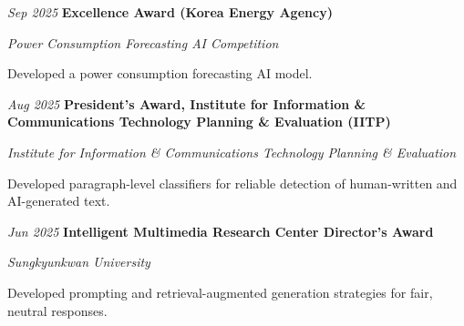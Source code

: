\vspace{0.08cm}

\begin{samepage}
    \begin{twocolentry}{\textit{Sep 2025}}
        \textbf{Excellence Award (Korea Energy Agency)}\href{https://github.com/rkdrn79/2025_Electricity_Consumption_Forecasting_AI_Competition_SKKUAI}{}
        \par\textit{Power Consumption Forecasting AI Competition}
    \end{twocolentry}
    \begin{onecolentry}
        \begin{highlights}
            \item Developed a power consumption forecasting AI model.
        \end{highlights}
    \end{onecolentry}
\end{samepage}

\vspace{0.08cm}

\begin{samepage}
    \begin{twocolentry}{\textit{Aug 2025}}
        \textbf{President's Award, Institute for Information \& Communications Technology Planning \& Evaluation (IITP)}\href{https://github.com/rkdrn79/2025_SW_Centered_University_Digital_Competition_SKKUAI}{}
        \par\textit{Institute for Information \& Communications Technology Planning \& Evaluation}
    \end{twocolentry}
    \begin{onecolentry}
        \begin{highlights}
            \item Developed paragraph-level classifiers for reliable detection of human-written and AI-generated text.
        \end{highlights}
    \end{onecolentry}
\end{samepage}

\vspace{0.08cm}

\begin{samepage}
    \begin{twocolentry}{\textit{Jun 2025}}
        \textbf{Intelligent Multimedia Research Center Director's Award}
        \par\textit{Sungkyunkwan University}
    \end{twocolentry}
    \begin{onecolentry}
        \begin{highlights}
            \item Developed prompting and retrieval-augmented generation strategies for fair, neutral responses.
        \end{highlights}
    \end{onecolentry}
\end{samepage}

